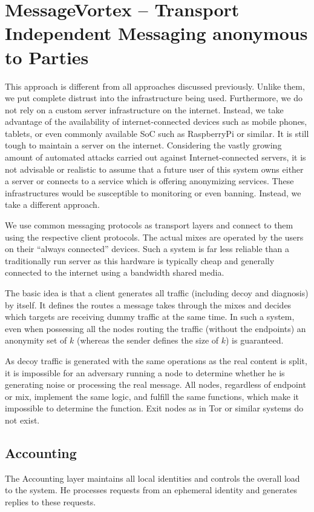 \chapter{MessageVortex -- Transport Independent Messaging anonymous to \texorpdfstring{}{3rd} Parties\label{sec:spec}}
This approach is different from all approaches discussed previously. Unlike them, we put complete distrust into the infrastructure being used. Furthermore, we do not rely on a custom server infrastructure on the internet. Instead, we take advantage of the availability of internet-connected devices such as mobile phones, tablets, or even commonly available SoC such as RaspberryPi or similar. It is still tough to maintain a server on the internet. Considering the vastly growing amount of automated attacks carried out against Internet-connected servers, it is not advisable or realistic to assume that a future user of this system owns either a server or connects to a service which is offering anonymizing services. These infrastructures would be susceptible to monitoring or even banning. Instead, we take a different approach.

We use common messaging protocols as transport layers and connect to them using the respective client protocols. The actual mixes are operated by the users on their ``always connected'' devices. Such a system is far less reliable than a traditionally run server as this hardware is typically cheap and generally connected to the internet using a bandwidth shared media.

The basic idea is that a client generates all traffic (including decoy and diagnosis) by itself. It defines the routes a message takes through the mixes and decides which targets are receiving dummy traffic at the same time. In such a system, even when possessing all the nodes routing the traffic (without the endpoints) an anonymity set of $k$ (whereas the sender defines the size of $k$) is guaranteed.

As decoy traffic is generated with the same operations as the real content is split, it is impossible for an adversary running a node to determine whether he is generating noise or processing the real message.
All nodes, regardless of endpoint or mix, implement the same logic, and fulfill the same functions, which make it impossible to determine the function. Exit nodes as in Tor or similar systems do not exist.

\section{Accounting}
The Accounting layer maintains all local identities and controls the overall load to the system. He processes requests from an ephemeral identity and generates replies to these requests. 


